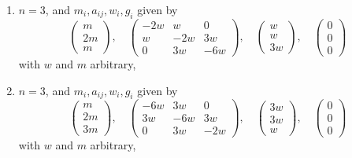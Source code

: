 \begin{lemma}
\begin{enumerate}
$$\right),
\quad
\left(
\begin{matrix}
w \\
w \\
w
\end{matrix}
\right),
\quad
\left(
\begin{matrix}
0 \\
0 \\
0
\end{matrix}
\right)
$$
with $w$ and $m$ arbitrary,
\item
\label{item-equal-up3}
$n = 3$, and $m_i, a_{ij}, w_i, g_i$ given by
$$
\left(
\begin{matrix}
m \\
2m \\
m
\end{matrix}
\right),
\quad
\left(
\begin{matrix}
-2w & w & 0 \\
w & -2w & 3w \\
0 & 3w & -6w
\end{matrix}
\right),
\quad
\left(
\begin{matrix}
w \\
w \\
3w
\end{matrix}
\right),
\quad
\left(
\begin{matrix}
0 \\
0 \\
0
\end{matrix}
\right)
$$
with $w$ and $m$ arbitrary,
\item
\label{item-equal-down3}
$n = 3$, and $m_i, a_{ij}, w_i, g_i$ given by
$$
\left(
\begin{matrix}
m \\
2m \\
3m
\end{matrix}
\right),
\quad
\left(
\begin{matrix}
-6w & 3w & 0 \\
3w & -6w & 3w \\
0 & 3w & -2w
\end{matrix}
\right),
\quad
\left(
\begin{matrix}
3w \\
3w \\
w
\end{matrix}
\right),
\quad
\left(
\begin{matrix}
0 \\
0 \\
0
\end{matrix}
\right)
$$
with $w$ and $m$ arbitrary,

\end{enumerate}
\end{lemma}
